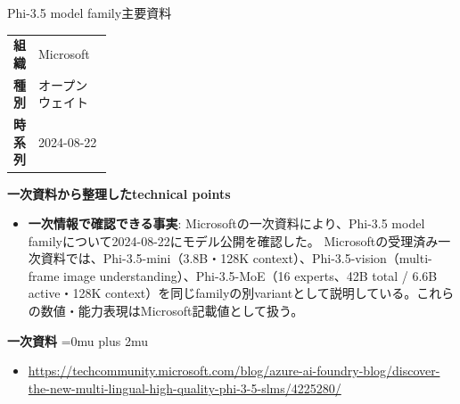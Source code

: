 \begin{technicalnote}{Phi-3.5 model family}{主要資料}
\begingroup
\begin{tabularx}{\linewidth}{@{}>{\bfseries}p{0.22\linewidth}X@{}}
組織 & Microsoft \\
種別 & オープンウェイト \\
時系列 & 2024-08-22 \\
\end{tabularx}
\smallskip
{\bfseries 一次資料から整理したtechnical points}
\begin{itemize}[leftmargin=1.5em,itemsep=0.35em]
\item \textbf{一次情報で確認できる事実}: Microsoftの一次資料により、Phi-3.5 model familyについて2024-08-22にモデル公開を確認した。 Microsoftの受理済み一次資料では、Phi-3.5-mini（3.8B・128K context）、Phi-3.5-vision（multi-frame image understanding）、Phi-3.5-MoE（16 experts、42B total / 6.6B active・128K context）を同じfamilyの別variantとして説明している。これらの数値・能力表現はMicrosoft記載値として扱う。
\end{itemize}
\begin{minipage}{\linewidth}
\begin{samepage}
{\bfseries 一次資料}
\begingroup\sloppy
\Urlmuskip=0mu plus 2mu\relax
\begin{itemize}[leftmargin=1.5em,itemsep=0.25em]
\item {\scriptsize\url{https://techcommunity.microsoft.com/blog/azure-ai-foundry-blog/discover-the-new-multi-lingual-high-quality-phi-3-5-slms/4225280/}}
\end{itemize}
\endgroup
\end{samepage}
\end{minipage}
\endgroup
\end{technicalnote}
\medskip


